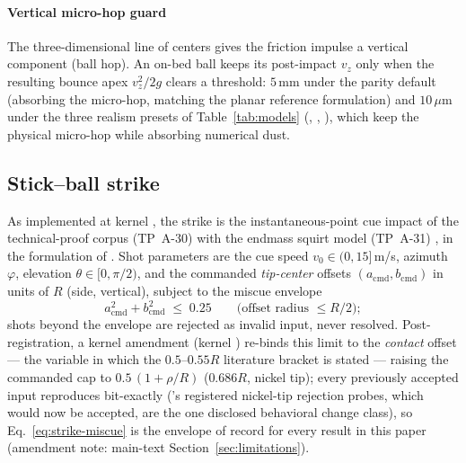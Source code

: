 \paragraph{Vertical micro-hop guard} The three-dimensional line of
centers gives the friction impulse a vertical component (ball hop). An
on-bed ball keeps its post-impact $v_z$ only when the resulting bounce
apex $v_z^{2}/2g$ clears a threshold: $5$\,mm under the parity default
(absorbing the micro-hop, matching the planar reference formulation)
and $10\,\mu$m under the three realism presets of
Table~\ref{tab:models} (,
, ), which keep the physical
micro-hop while absorbing numerical dust.

\subsection{Stick--ball strike}
\label{sec:appendix-eq-strike}

As implemented at kernel , the strike is the
instantaneous-point cue impact of the technical-proof corpus (TP~A-30)
with the endmass squirt model (TP~A-31)
\citep{alciatore_tp_a31,cross2008squirt,shepard2001squirt}, in the
formulation of \citet{kiefl2024pooltool}. Shot parameters are the cue
speed $v_0 \in (0, 15]$\,m/s, azimuth $\varphi$, elevation
$\theta \in [0, \pi/2)$, and the commanded \emph{tip-center} offsets
$(a_{\mathrm{cmd}}, b_{\mathrm{cmd}})$ in units of $R$ (side, vertical), subject to the miscue envelope
\begin{equation}
a_{\mathrm{cmd}}^{2} + b_{\mathrm{cmd}}^{2} \;\le\; 0.25
\qquad\text{(offset radius $\le R/2$)};
\label{eq:strike-miscue}
\end{equation}
shots beyond the envelope are rejected as invalid input, never
resolved. Post-registration, a kernel amendment (kernel
) re-binds this limit to the \emph{contact}
offset --- the variable in which the $0.5$--$0.55R$ literature bracket
is stated --- raising the commanded cap to $0.5\,(1 + \rho/R)$
($0.686R$, nickel tip); every previously accepted input reproduces
bit-exactly ('s registered nickel-tip rejection probes,
which would now be accepted, are the one disclosed behavioral change
class), so Eq.~\eqref{eq:strike-miscue} is the envelope of record for
every result in this paper (amendment note: main-text
Section~\ref{sec:limitations}).

